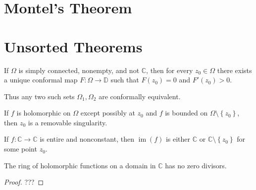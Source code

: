 \hypertarget{montels-theorem}{%
\section{Montel's Theorem}\label{montels-theorem}}

\hypertarget{unsorted-theorems}{%
\section{Unsorted Theorems}\label{unsorted-theorems}}

\begin{theorem}

If \(\Omega\) is simply connected, nonempty, and not \({\mathbb{C}}\),
then for every \(z_{0}\in \Omega\) there exists a unique conformal map
\(F:\Omega \to {\mathbb{D}}\) such that \(F(z_{0}) = 0\) and
\(F'(z_{0}) > 0\).

Thus any two such sets \(\Omega_{1}, \Omega_{2}\) are conformally
equivalent.

\end{theorem}

\begin{theorem}

If \(f\) is holomorphic on \(\Omega\) except possibly at \(z_0\) and
\(f\) is bounded on \(\Omega\setminus\left\{{z_0}\right\}\), then
\(z_0\) is a removable singularity.

\end{theorem}

\begin{theorem}

If \(f:{\mathbb{C}}\to {\mathbb{C}}\) is entire and nonconstant, then
\(\operatorname{im}(f)\) is either \({\mathbb{C}}\) or
\({\mathbb{C}}\setminus\left\{{z_0}\right\}\) for some point \(z_0\).

\end{theorem}


\begin{corollary}

The ring of holomorphic functions on a domain in \({\mathbb{C}}\) has no
zero divisors.

\end{corollary}

\begin{proof}

???

\end{proof}

